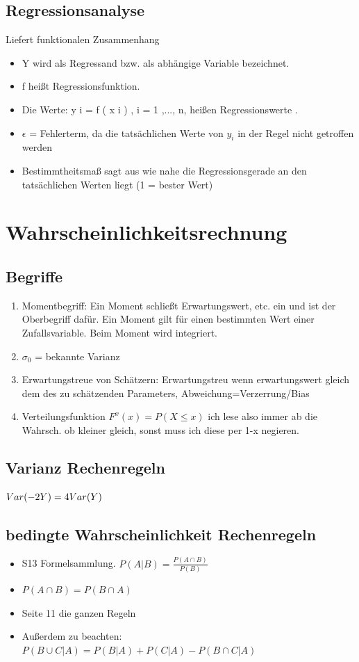 \documentclass[10pt,a4paper]{article}
\begin{document}
	 \subsection{Regressionsanalyse}
	 Liefert funktionalen Zusammenhang 
	 \begin{itemize}
	   \item Y wird als Regressand bzw. als abhängige Variable bezeichnet.
	   \item f heißt Regressionsfunktion.
	   \item Die Werte: y i = f ( x i ) , i = 1 ,..., n, heißen Regressionswerte .
	   \item $\epsilon$ =  Fehlerterm, da die tatsächlichen Werte von $y_i$ in der Regel nicht getroffen werden
		\item Bestimmtheitsmaß sagt aus wie nahe die Regressionsgerade an den tatsächlichen Werten liegt (1 = bester Wert)	
	 \end{itemize}
	
	\section{Wahrscheinlichkeitsrechnung}
	
	\subsection{Begriffe}
	\begin{enumerate}
		\item Momentbegriff: Ein Moment schließt Erwartungswert, etc. ein und ist der Oberbegriff dafür. Ein Moment gilt für einen bestimmten Wert einer Zufallsvariable. Beim Moment wird integriert.
		\item $\sigma_0$ = bekannte Varianz
		\item Erwartungstreue von Schätzern: Erwartungstreu wenn erwartungswert gleich dem des zu schätzenden Parameters, Abweichung=Verzerrung/Bias
		\item Verteilungsfunktion $F^x(x)=P(X\leq x)$ ich lese also immer ab die Wahrsch. ob kleiner gleich, sonst muss ich diese per 1-x negieren.
	\end{enumerate}
	\subsection{Varianz Rechenregeln}
	$Var(-2Y)=4\space Var(Y)$
	\subsection{bedingte Wahrscheinlichkeit Rechenregeln}
	\begin{itemize}
		\item S13 Formelsammlung. $P(A|B)=\frac{P(A\cap B)}{P(B)}$
		\item $P(A\cap B)=P(B\cap A)$
		\item Seite 11 die ganzen Regeln
		\item Außerdem zu beachten: ${P(B\cup C | A)} = P(B|A)+P(C|A) - P(B\cap C | A)$
	\end{itemize}
\end{document}
